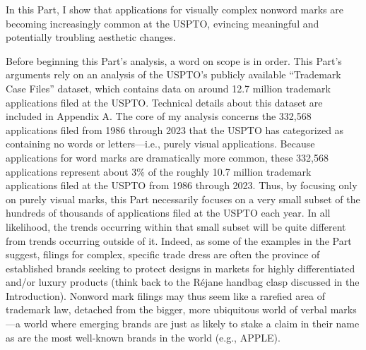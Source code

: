 \documentclass[letterpaper, 11pt, oneside]{article}
\begin{document}
In this Part, I show that applications for visually complex nonword marks are becoming increasingly common at the USPTO, evincing meaningful and potentially troubling aesthetic changes.

Before beginning this Part's analysis, a word on scope is in order. This Part's arguments rely on an analysis of the USPTO's publicly available ``Trademark Case Files'' dataset, which contains data on around 12.7 million trademark applications filed at the USPTO. Technical details about this dataset are included in Appendix A. The core of my analysis concerns the 332,568 applications filed from 1986 through 2023 that the USPTO has categorized as containing no words or letters—i.e., purely visual applications. Because applications for word marks are dramatically more common, these 332,568 applications represent about 3\% of the roughly 10.7 million trademark applications filed at the USPTO from 1986 through 2023. Thus, by focusing only on purely visual marks, this Part necessarily focuses on a very small subset of the hundreds of thousands of applications filed at the USPTO each year. In all likelihood, the trends occurring within that small subset will be quite different from trends occurring outside of it. Indeed, as some of the examples in the Part suggest, filings for complex, specific trade dress are often the province of established brands seeking to protect designs in markets for highly differentiated and/or luxury products (think back to the Réjane handbag clasp discussed in the Introduction). Nonword mark filings may thus seem like a rarefied area of trademark law, detached from the bigger, more ubiquitous world of verbal marks—a world where emerging brands are just as likely to stake a claim in their name as are the most well-known brands in the world (e.g., APPLE).
\end{document}

